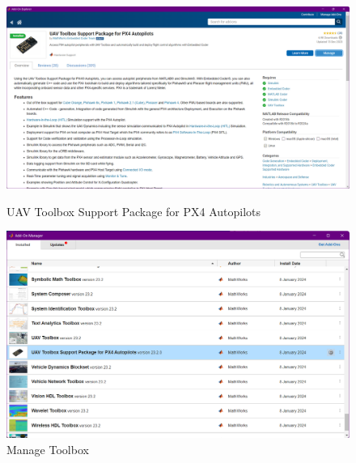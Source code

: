 \begin{figure}[htbp]
    \begin{minipage}[b]{0.5\linewidth} %
        \centering
        \includegraphics[width=\linewidth]{files/images/Screenshot 2024-03-13 120711.png} %
        \caption{UAV Toolbox Support Package for PX4 Autopilots}
        \label{fig:UAV Toolbox Support Package for PX4 Autopilots}
    \end{minipage}%
    \begin{minipage}[b]{0.5\linewidth} %
        \centering
        \includegraphics[width=\linewidth]{files/images/Screenshot 2024-03-13 120731.png} %
        \caption{Manage Toolbox}
        \label{fig:Manage Toolbox}
    \end{minipage}
\end{figure}


